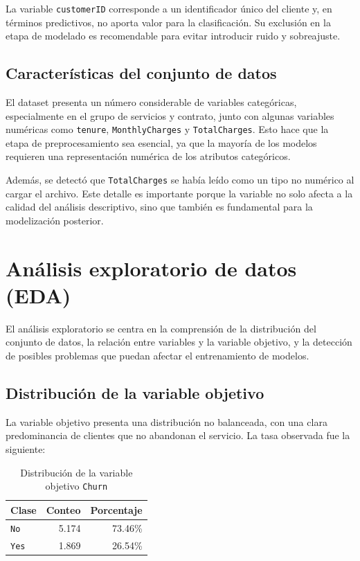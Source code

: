\documentclass[conference]{IEEEtran}
\begin{document}
La variable \texttt{customerID} corresponde a un identificador único del cliente y, en términos predictivos, no aporta valor para la clasificación. Su exclusión en la etapa de modelado es recomendable para evitar introducir ruido y sobreajuste.

\subsection{Características del conjunto de datos}
El dataset presenta un número considerable de variables categóricas, especialmente en el grupo de servicios y contrato, junto con algunas variables numéricas como \texttt{tenure}, \texttt{MonthlyCharges} y \texttt{TotalCharges}. Esto hace que la etapa de preprocesamiento sea esencial, ya que la mayoría de los modelos requieren una representación numérica de los atributos categóricos.

Además, se detectó que \texttt{TotalCharges} se había leído como un tipo no numérico al cargar el archivo. Este detalle es importante porque la variable no solo afecta a la calidad del análisis descriptivo, sino que también es fundamental para la modelización posterior.

\section{Análisis exploratorio de datos (EDA)}
El análisis exploratorio se centra en la comprensión de la distribución del conjunto de datos, la relación entre variables y la variable objetivo, y la detección de posibles problemas que puedan afectar el entrenamiento de modelos.

\subsection{Distribución de la variable objetivo}
La variable objetivo presenta una distribución no balanceada, con una clara predominancia de clientes que no abandonan el servicio. La tasa observada fue la siguiente:

\begin{table}[H]
\centering
\caption{Distribución de la variable objetivo \texttt{Churn}}
\small
\begin{tabular}{lrr}
\toprule
Clase & Conteo & Porcentaje \\
\midrule
\texttt{No} & 5.174 & 73.46\% \\
\texttt{Yes} & 1.869 & 26.54\% \\
\bottomrule
\end{tabular}
\end{table}
\end{document}
